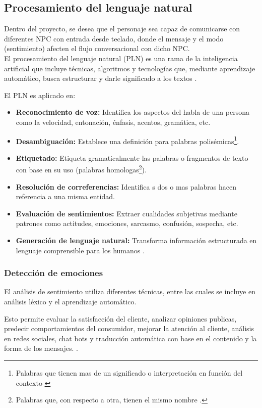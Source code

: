 \documentclass[12pt,twoside]{article}
\begin{document}
	\subsection{Procesamiento del lenguaje natural}
	Dentro del proyecto, se desea que el personaje sea capaz de comunicarse con diferentes NPC con entrada desde teclado, donde el mensaje y el modo (sentimiento) afecten el flujo conversacional con dicho NPC. \\
	
	El procesamiento del lenguaje natural (PLN) es una rama de la inteligencia artificial que incluye técnicas, algoritmos y tecnologías que, mediante aprendizaje automático, busca estructurar y darle significado a los textos \cite{info: pln1}.
	
	El PLN es aplicado en: 
	\begin{itemize}[noitemsep]
		\item \textbf{Reconocimiento de voz:} Identifica los aspectos del habla de una persona como la velocidad, entonación, énfasis, acentos, gramática, etc.
		\item \textbf{Desambiguación:} Establece una definición para palabras polisémicas\footnote{Palabras que tienen mas de un significado o interpretación en función del contexto \cite{info:def: polisemica}}.
		\item \textbf{Etiquetado:} Etiqueta gramaticalmente las palabras o fragmentos de texto con base en su uso (palabras homologas\footnote{Palabras que, con respecto a otra, tienen el mismo nombre \cite{info:def: homonimo}.}). 
		\item \textbf{Resolución de correferencias: } Identifica  s dos o mas palabras hacen referencia a una misma entidad.
		\item \textbf{Evaluación de sentimientos: } Extraer cualidades subjetivas mediante patrones como actitudes, emociones, sarcasmo, confusión, sospecha, etc.
		\item \textbf{Generación de lenguaje natural: } Transforma información estructurada en lenguaje comprensible para los humanos \cite{info: pln2}.
	\end{itemize}
	
	\subsubsection{Detección de emociones}
	El análisis de sentimiento utiliza diferentes técnicas, entre las cuales se incluye en análisis léxico y el aprendizaje automático.
	
	Esto permite evaluar la satisfacción del cliente, analizar opiniones publicas, predecir comportamientos del consumidor, mejorar la atención al cliente, análisis en redes sociales, chat bots y traducción automática con base en el contenido y la forma de los mensajes. \cite{info: pln3}.
	
\end{document}
